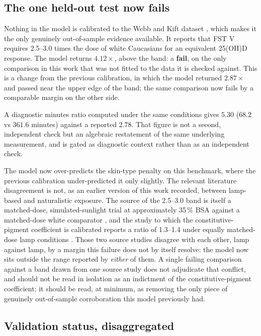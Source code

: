 \documentclass[11pt]{article}
\begin{document}
\subsection{The one held-out test now fails}

Nothing in the model is calibrated to the Webb and Kift dataset
\citep{webbkift2018}, which makes it the only genuinely out-of-sample
evidence available. It reports that FST V requires 2.5--3.0 times the
dose of white Caucasians for an equivalent 25(OH)D response. The model
returns $4.12\times$, above the band: a \textbf{fail}, on the only
comparison in this work that was not fitted to the data it is checked
against. This is a change from the previous calibration, in which the
model returned $2.87\times$ and passed near the upper edge of the
band; the same comparison now fails by a comparable margin on the
other side.

A diagnostic minutes ratio computed under the same conditions gives
$5.30$ ($68.2$ vs $361.6$ minutes) against a reported $2.78$. That
figure is not a second, independent check but an algebraic
restatement of the same underlying measurement, and is gated as
diagnostic context rather than as an independent check.

The model now over-predicts the skin-type penalty on this benchmark,
where the previous calibration under-predicted it only slightly. The
relevant literature disagreement is not, as an earlier version of this
work recorded, between lamp-based and naturalistic exposure. The
source of the 2.5--3.0 band is itself a matched-dose, simulated-sunlight
trial at approximately 35\,\% BSA against a matched-dose white
comparator \citep{farrar2013}, and the study to which the
constitutive-pigment coefficient is calibrated reports a ratio of
1.3--1.4 under equally matched-dose lamp conditions \citep{young2020}.
Those two source studies disagree with each other, lamp against lamp,
by a margin this failure does not by itself resolve: the model now
sits outside the range reported by \emph{either} of them. A single
failing comparison against a band drawn from one source study does not
adjudicate that conflict, and should not be read in isolation as an
indictment of the constitutive-pigment coefficient; it should be read,
at minimum, as removing the only piece of genuinely out-of-sample
corroboration this model previously had.

\subsection{Validation status, disaggregated}
\end{document}
